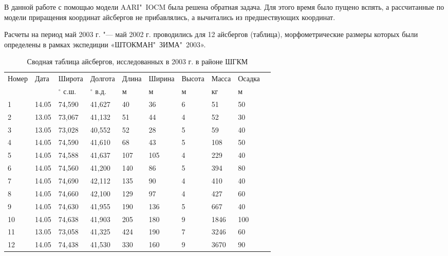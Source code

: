В данной работе с помощью модели AARI"~IOCM была решена обратная задача. Для этого время было пущено вспять, а рассчитанные по модели приращения координат айсбергов не прибавлялись, а вычитались из предшествующих координат.

Расчеты на период май 2003 г. "--- май 2002 г. проводились для 12 айсбергов (таблица), морфометрические размеры которых были определены в рамках экспедиции «ШТОКМАН"~ЗИМА"~2003».

\begin{table} [htbp]%
	\centering
	\caption{Сводная таблица айсбергов, исследованных в 2003 г. в районе ШГКМ}%
	\label{tbl:tbl_icbergs_shtockman_2003}%
	\renewcommand{\arraystretch}{1.5}%
	\setlength{\tymax}{1.9cm}
	\begin{SingleSpace}
		\begin{tabular}{@{}@{\extracolsep{0pt}}llllllllll@{}} %
			\toprule     %
			Номер & Дата & Широта & Долгота & Длина & Ширина & Высота & Масса & Осадка &\\
			      &      & $^\circ$ с.ш. & $^\circ$ в.д. & м & м & м & кг & м &\\
			\midrule %
			
			1	&14.05	&74,590	&41,627	&40	&36	&6	&51	&50\\
			2	&13.05	&73,067	&41,132	&51	&44	&4	&52	&30\\
			3	&13.05	&73,028	&40,552	&52	&28	&5	&59	&40\\
			4	&14.05	&74,590	&41,610	&68	&43	&5	&108	&50\\
			5	&14.05	&74,588	&41,637	&107 &105	&4	&229	&40\\
			6	&14.05	&74,560	&41,200	&140 &86	&5	&394	&80\\
			7	&14.05	&74,690	&42,112	&135 &90	&4	&410	&40\\
			8	&14.05	&74,660	&42,100	&129 &97	&4	&427	&60\\
			9	&14.05	&74,630	&41,955	&190 &136	&5	&667	&40\\
			10	&14.05	&74,638	&41,903	&205 &180	&9	&1846	&100\\
			11	&13.05	&73,058	&41,325	&424 &190	&7	&3246	&60\\
			12	&14.05	&74,438	&41,530	&330 &160	&9	&3670	&90\\
			
			
			\bottomrule %
		\end{tabular}%
	\end{SingleSpace}
\end{table}

